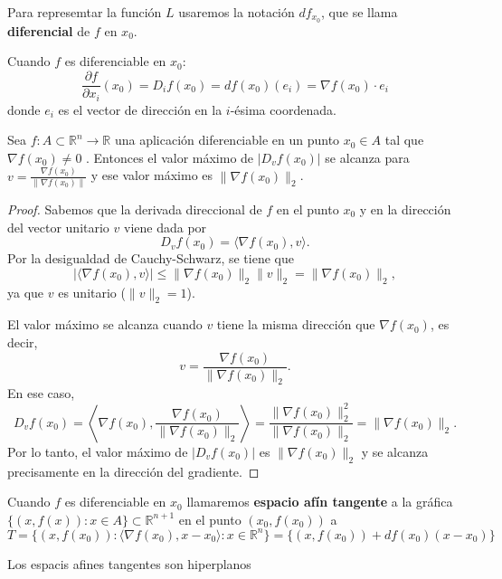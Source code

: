 \begin{definición}[Diferencial]
    Para represemtar la función $L$ usaremos la notación $df_{x_0}$, que se llama \textbf{diferencial} de $f$ en $x_0$. \\
\end{definición}
\begin{observación}
    Cuando $f$ es diferenciable en $x_0$:
    $$ \frac{\partial f}{\partial x_i}(x_0) = D_{i}f(x_0) = df(x_0)(e_i) = \nabla f(x_0) \cdot e_i $$
    donde $e_i$ es el vector de dirección en la $i$-ésima coordenada. 
\end{observación}

\begin{corolario}
    Sea $f: A \subset \mathbb{R}^n \to \mathbb{R}$ una aplicación diferenciable en un punto $x_0 \in A$ tal que $\nabla f(x_0) \neq 0$ . Entonces el valor máximo de $|D_vf(x_0)|$ se alcanza para $v = \frac{\nabla f(x_0)}{\|\nabla f(x_0)\|}$ y ese valor máximo es $\|\nabla f(x_0)\|_2$.
\end{corolario}
\begin{proof}
    Sabemos que la derivada direccional de $f$ en el punto $x_0$ y en la dirección del vector unitario $v$ viene dada por
    \[
    D_v f(x_0) = \langle \nabla f(x_0), v \rangle.
    \]
    Por la desigualdad de Cauchy-Schwarz, se tiene que
    \[
    |\langle \nabla f(x_0), v \rangle| \leq \|\nabla f(x_0)\|_2 \|v\|_2 = \|\nabla f(x_0)\|_2,
    \]
    ya que $v$ es unitario ($\|v\|_2 = 1$).

    El valor máximo se alcanza cuando $v$ tiene la misma dirección que $\nabla f(x_0)$, es decir,
    \[
    v = \frac{\nabla f(x_0)}{\|\nabla f(x_0)\|_2}.
    \]
    En ese caso,
    \[
    D_v f(x_0) = \left\langle \nabla f(x_0), \frac{\nabla f(x_0)}{\|\nabla f(x_0)\|_2} \right\rangle
    = \frac{\|\nabla f(x_0)\|_2^2}{\|\nabla f(x_0)\|_2} = \|\nabla f(x_0)\|_2.
    \]
    Por lo tanto, el valor máximo de $|D_v f(x_0)|$ es $\|\nabla f(x_0)\|_2$ y se alcanza precisamente en la dirección del gradiente.
\end{proof}

\begin{definición}
    Cuando $f$ es diferenciable en $x_0$ llamaremos \textbf{espacio afín tangente} a la gráfica $\{(x,f(x)) : x \in A\} \subset \mathbb{R}^{n+1}$ en el punto $(x_0,f(x_0))$ a
    $$ T = \{(x,f(x_0)) : \langle \nabla f(x_0), x - x_0\rangle : x\in \mathbb{R}^n\} = \{(x, f(x_0)) + df(x_0)(x - x_0)\}$$
\end{definición}
\begin{observación}
    Los espacis afines tangentes son hiperplanos
\end{observación}


